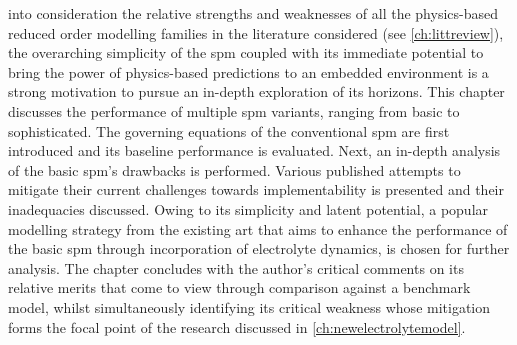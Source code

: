 

 into consideration the  relative strengths and weaknesses
of  all the  physics-based reduced  order modelling  families in  the literature
considered  (see  \cref{ch:littreview}),  the   overarching  simplicity  of  the
\gls{spm}  coupled  with   its  immediate  potential  to  bring   the  power  of
physics-based predictions to  an embedded environment is a  strong motivation to
pursue  an in-depth  exploration of  its  horizons. This  chapter discusses  the
performance of multiple \gls{spm} variants, ranging from basic to sophisticated.
The governing equations  of the conventional \gls{spm} are  first introduced and
its baseline performance  is evaluated. Next, an in-depth analysis  of the basic
\gls{spm}'s drawbacks is performed. Various published attempts to mitigate their
current challenges towards implementability  is presented and their inadequacies
discussed. Owing  to its  simplicity and latent  potential, a  popular modelling
strategy from the existing art that aims to enhance the performance of the basic
\gls{spm} through incorporation  of electrolyte dynamics, is  chosen for further
analysis.  The chapter  concludes with  the  author's critical  comments on  its
relative merits that come to view  through comparison against a benchmark model,
whilst simultaneously  identifying its critical weakness  whose mitigation forms
the focal point of the research discussed in \cref{ch:newelectrolytemodel}.

